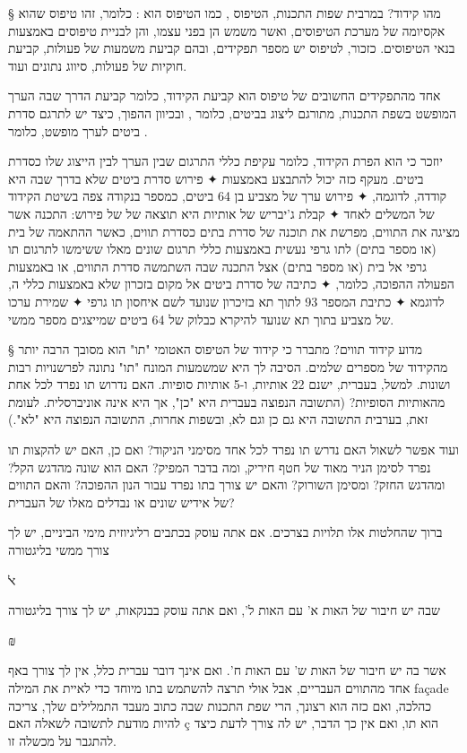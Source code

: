 § מהו קידוד?
במרבית שפות התכנות, הטיפוס , כמו הטיפוס  הוא
: כלומר, זהו טיפוס שהוא אקסיומה של מערכת הטיפוסים, ואשר משמש
הן בפני עצמו, והן לבניית טיפוסים באמצעות בנאי הטיפוסים. כזכור, לטיפוס יש מספר
תפקידים, ובהם קביעת משמעות של פעולות, קביעת חוקיות של פעולות, סיווג נתונים
ועוד.
  
אחד מהתפקידים החשובים של טיפוס הוא קביעת הקידוד, כלומר קביעת הדרך שבה הערך
המופשט בשפת התכנות, מתורגם ליצוג בביטים, כלומר , ובכיוון ההפוך,
כיצד יש לתרגם סדרת ביטים לערך מופשט, כלומר .
  
יוזכר כי  הוא הפרת הקידוד, כלומר עקיפת כללי התרגום שבין הערך
לבין הייצוג שלו כסדרת ביטים. מעקף כזה יכול להתבצע באמצעות 
✦ פירוש סדרת ביטים שלא בדרך שבה היא קודדה, לדוגמה,
✦ פירוש ערך של מצביע בן 64 ביטים, כמספר בנקודה צפה בשיטת הקידוד של המשלים לאחד
✦ קבלת ג'יבריש של אותיות היא תוצאה של  של פירוש: התכנה אשר מציגה את התווים, מפרשת את תוכנה של סדרת בתים כסדרת תווים, כאשר ההתאמה של בית (או מספר בתים) לתו גרפי נעשית באמצעות כללי תרגום שונים מאלו ששימשו לתרגום תו גרפי אל בית (או מספר בתים) אצל התכנה שבה השתמשה סדרת התווים,
או באמצעות הפעולה ההפוכה, כלומר,
✦ כתיבה של סדרת ביטים אל מקום בזכרון שלא באמצעות כללי ה, לדוגמא
✦ כתיבת המספר 93 לתוך תא בזיכרון שנועד לשם איחסון תו גרפי
✦ שמירת ערכו של מצביע בתוך תא שנועד להיקרא כבלוק של 64 ביטים שמייצגים מספר ממשי.

§ מדוע קידוד תווים?
מתברר כי קידוד של הטיפוס האטומי "תו" הוא מסובך הרבה יותר מהקידוד של מספרים שלמים. הסיבה לך היא שמשמעות המונח "תו" נתונה לפרשנויות רבות ושונות. למשל, בעברית, ישנם 22 אותיות, ו-5 אותיות סופיות. האם נדרוש תו נפרד לכל אחת מהאותיות הסופיות? (התשובה הנפוצה בעברית היא "כן", אך היא אינה אוניברסלית. לעומת זאת, בערבית התשובה היא גם כן וגם לא, ובשפות אחרות, התשובה הנפוצה היא "לא".)

ועוד אפשר לשאול האם נדרש תו נפרד לכל אחד מסימני הניקוד? ואם כן, האם יש להקצות תו נפרד לסימן הניר מאוד של חטף חיריק, ומה בדבר המפיק? האם הוא שונה מהדגש הקל? ומהדגש החזק? ומסימן השורוק? והאם יש צורך בתו נפרד עבור הנון ההפוכה? והאם התווים של אידיש שונים או נבדלים מאלו של העברית?


ברוך שהחלטות אלו תלויות בצרכים. אם אתה עוסק בכתבים רליגיוזית מימי הביניים, יש לך צורך ממשי בליגטורה
\begin{center}
\Huge{ﭏ}
\normalsize{}
\end{center}
שבה יש חיבור של האות א' עם האות ל', ואם אתה עוסק בבנקאות, יש לך צורך בליגטורה
\begin{center}
\Huge{₪}
\normalsize{}
\end{center}
אשר בה יש חיבור של האות ש' עם האות ח'. ואם אינך דובר עברית כלל, אין לך צורך באף אחד מהתווים העבריים, אבל אולי תרצה להשתמש בתו מיוחד כדי לאיית את המילה façade כהלכה, ואם כזה הוא רצונך, הרי שפת התכנות שבה כתוב מעבד התמלילים שלך, צריכה להיות מודעת לתשובה לשאלה האם ç הוא תו, ואם אין כך הדבר, יש לה צורך לדעת כיצד להתגבר על מכשלה זו.
  

